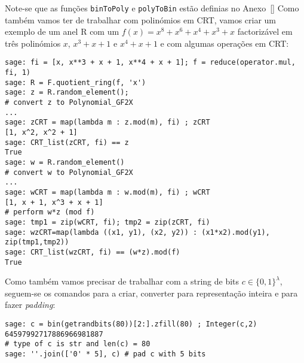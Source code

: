Note-se que as funções \verb|binToPoly| e \verb|polyToBin| estão definias no Anexo~\ref{}
Como também vamos ter de trabalhar com polinómios em CRT, vamos criar um exemplo de um anel \textsf{R} com um $f(x) = x^8 + x^6 + x^4 + x^3 + x$ factorizável em três polinómios $x$, $x^3 + x + 1$ e $x^4 + x + 1$ e com algumas operações em CRT:
\begin{lstlisting}[style=sage]
sage: fi = [x, x**3 + x + 1, x**4 + x + 1]; f = reduce(operator.mul, fi, 1)
sage: R = F.quotient_ring(f, 'x')
sage: z = R.random_element();
# convert z to Polynomial_GF2X
...
sage: zCRT = map(lambda m : z.mod(m), fi) ; zCRT
[1, x^2, x^2 + 1]
sage: CRT_list(zCRT, fi) == z
True
sage: w = R.random_element()
# convert w to Polynomial_GF2X
...
sage: wCRT = map(lambda m : w.mod(m), fi) ; wCRT
[1, x + 1, x^3 + x + 1]
# perform w*z (mod f)
sage: tmp1 = zip(wCRT, fi); tmp2 = zip(zCRT, fi)
sage: wzCRT=map(lambda ((x1, y1), (x2, y2)) : (x1*x2).mod(y1), zip(tmp1,tmp2))
sage: CRT_list(wzCRT, fi) == (w*z).mod(f)
True
\end{lstlisting}
Como também vamos precisar de trabalhar com a string de bits $c \in \{0, 1\}^\lambda$, seguem-se os comandos para a criar, converter para representação inteira e para fazer \textit{padding}:
\begin{lstlisting}[style=sage]
sage: c = bin(getrandbits(80))[2:].zfill(80) ; Integer(c,2)
64597992717886966981887
# type of c is str and len(c) = 80
sage: ''.join(['0' * 5], c) # pad c with 5 bits
\end{lstlisting}
